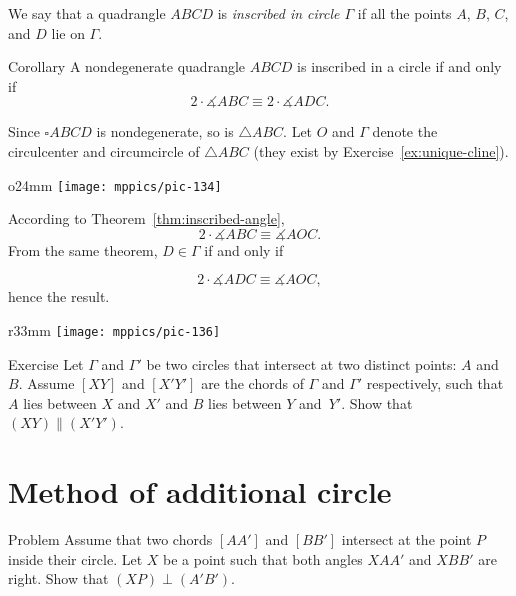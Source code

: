 We say that a quadrangle $ABCD$ is 
\emph{inscribed in circle $\Gamma$}
if all the points $A$, $B$, $C$, and $D$ lie on $\Gamma$.

\begin{thm}{Corollary}\label{cor:inscribed-quadrangle}
A nondegenerate quadrangle $ABCD$ is inscribed in a circle if and only if 
\[2\cdot\measuredangle ABC\equiv 2\cdot\measuredangle ADC.\]

\end{thm}

Since $\square ABCD$ is nondegenerate, so is $\triangle ABC$.
Let $O$ and $\Gamma$ denote the circulcenter and circumcircle of $\triangle ABC$ (they exist by Exercise~\ref{ex:unique-cline}).

{

\begin{wrapfigure}[10]{o}{24mm}
\vskip-0mm
\centering
\texttt{[image: mppics/pic-134]}
\end{wrapfigure}

According to Theorem~\ref{thm:inscribed-angle},
$$
2\cdot\measuredangle ABC
\equiv
\measuredangle AOC.
$$
From the same theorem, $D\in\Gamma$ if and only if 

$$
2\cdot\measuredangle ADC
\equiv\measuredangle AOC,
$$
hence the result.
\qeds

}


{

\begin{wrapfigure}{r}{33mm}
\vskip-6mm
\centering
\texttt{[image: mppics/pic-136]}
\end{wrapfigure}

\begin{thm}{Exercise}\label{ex:secant-circles}
Let $\Gamma$ and $\Gamma'$
be two circles 
that intersect at two distinct points: $A$ and~$B$.
Assume $[XY]$ and $[X'Y']$ are the chords of $\Gamma$ and $\Gamma'$ respectively,
such that $A$ lies between $X$ and $X'$ and $B$ lies between $Y$ and~$Y'$.
Show that $(XY)\parallel (X'Y')$.
\end{thm}

}

\section*{Method of additional circle}

\begin{thm}{Problem}\label{prob:add-circ}
Assume that two chords $[AA']$ and $[BB']$ intersect at the point $P$ inside their circle.
Let $X$ be a point such that both angles $XAA'$ and $XBB'$ are right.
Show that $(XP)\perp(A'B')$.
\end{thm}

